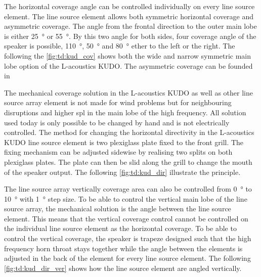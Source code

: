 The horizontal coverage angle can be controlled individually on every line source element. The line source element allows both symmetric horizontal coverage and asymmetric coverage. The angle from the frontal direction to the outer main lobe  is either \SI{25}{\degree} or \SI{55}{\degree}. By this two angle for both sides, four coverage angle of the speaker is possible, \SI{110}{\degree}, \SI{50}{\degree} and \SI{80}{\degree} ether to the left or the right. The following the \autoref{fig:td:kud_cov} shows both the wide and narrow symmetric main lobe option of the L-acoustics KUDO. The asymmetric coverage can be founded in \citep{KUDO_data}




The mechanical coverage solution in the L-acoustics KUDO as well as other line source array element is not made for wind problems but for neighbouring disruptions and higher \gls{spl} in the main lobe of the high frequency. All solution used today is only possible to be changed by hand and is not electrically controlled. The method for changing the horizontal directivity in the L-acoustics KUDO line source element is two plexiglass plate fixed to the front grill. The fixing mechanism can be adjusted sidewise by realising two splits on both plexiglass plates. The plate can then be slid along the grill to change the mouth of the speaker output. The following \autoref{fig:td:kud_dir} illustrate the principle.




The line source array vertically coverage area can also be controlled from \SI{0}{\degree} to \SI{10}{\degree} with \SI{1}{\degree} step size. To be able to control the vertical main lobe of the line source array, the mechanical solution is the angle between the line source element. This means that the vertical coverage control cannot be controlled on the individual line source element as the horizontal coverage. To be able to control the vertical coverage, the speaker is trapeze designed such that the high frequency horn throat stays together while the angle between the elements is adjusted in the back of the element for every line source element. The following \autoref{fig:td:kud_dir_ver} shows how the line source element are angled vertically.

